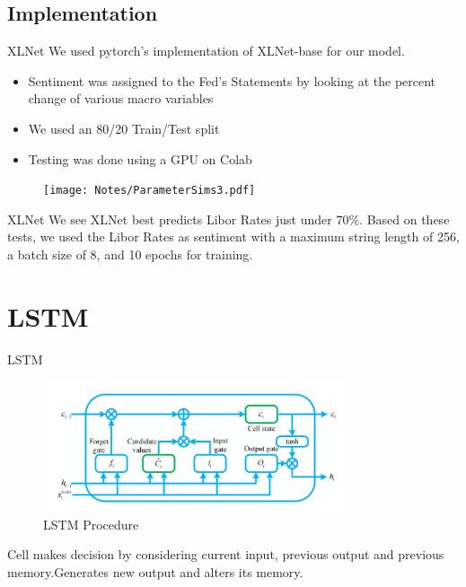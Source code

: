 \documentclass[14pt,aspectratio=169]{beamer}
\newcommand{\IMP}{Implementation}
\newcommand{\XL}{XLNet}
\newcommand{\LS}{LSTM}
\begin{document}
\subsection{\IMP}
\begin{frame}{\XL}
    We used pytorch's implementation of XLNet-base for our model.
    \begin{itemize}
        \item Sentiment was assigned to the Fed's Statements by looking at the percent change of various macro variables
        \item We used an 80/20 Train/Test split \\
        \item Testing was done using a GPU on Colab
    \end{itemize}
\end{frame}

\begin{frame}
    \vspace{-0.55in}
    \begin{figure}[ht]
        \centering
        \texttt{[image: Notes/ParameterSims3.pdf]}
    \end{figure}
\end{frame}

\begin{frame}{\XL}
    We see XLNet best predicts Libor Rates just under 70\%.
    Based on these tests, we used the Libor Rates as sentiment with a maximum string length of 256, a batch size of 8, and 10 epochs for training.
\end{frame}

\section{\LS}
\begin{frame}{\LS}
\begin{figure}[htp]
    \centering
    \includegraphics[width=9cm]{LSTM.png}
    \caption{LSTM Procedure}
    \label{fig:LSTM}
\end{figure}
Cell makes decision by considering current input, previous output and previous memory.Generates new output and alters its memory.
\end{frame}
\end{document}

